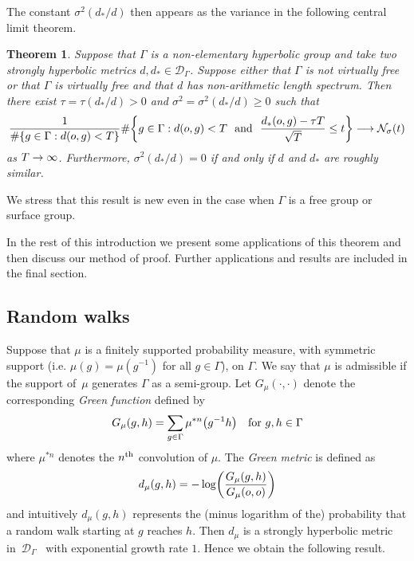 \documentclass[10pt]{amsart}
\theoremstyle{definition}\newtheorem{defi}[theo]{Definition}\newtheorem{rema}[theo]{Remark}\newtheorem{exam}[theo]{Example}\newtheorem{exem}[theo]{Example}\newtheorem{nota}[theo]{Notation}
\newcommand{\G}{\Gamma}
\newcommand{\Dc}{\mathcal{D}}
\newcommand{\Nc}{\mathcal{N}}
\let\originalleft\left
\let\originalright\right
\renewcommand{\left}{\mathopen{}\mathclose\bgroup\originalleft}
\renewcommand{\right}{\aftergroup\egroup\originalright}
\renewcommand*{\to}{\mathchoice{\longrightarrow}{\rightarrow}{\rightarrow}{\rightarrow}}
\newcounter{setofcase}
\newcounter{case}[setofcase]
\theoremstyle{plain}
\newtheorem{theol}{Theorem}
\begin{document}
The constant $\sigma^2(d_\ast/d)$ then appears as the variance in the following central limit theorem.


\begin{theol}\label{thm.main}
Suppose that $\G$ is a non-elementary hyperbolic group and take two strongly hyperbolic metrics $d,d_\ast \in \Dc_\G$. Suppose either that $\G$ is not virtually free or that $\G$ is virtually free and that $d$ has non-arithmetic length spectrum. Then there exist $\tau = \tau(d_\ast/d) >0$ and $\sigma^2 = \sigma^2(d_\ast/d) \ge 0$ such that
\[
\frac{1}{\#\left\{ g \in \G: d(o,g) < T\right\}} \#\left\{ g \in \G: d(o,g) < T \ \text{ and } \ \frac{d_\ast(o,g) - \tau T}{\sqrt{T}} \le t \right\} \to \Nc_\sigma(t)
\]
as $T\to\infty$. Furthermore, $\sigma^2(d_\ast/d) = 0$ if and only if $d$ and $d_\ast$ are roughly similar.
\end{theol}


We stress that this result is new even in the case when $\G$ is a free group or surface group.


In the rest of this introduction we present some applications of this theorem and then discuss our method of proof. Further applications and results are included in the final section.

\subsection{Random walks}

Suppose that $\mu$ is a finitely supported probability measure, with symmetric support (i.e. $\mu(g) = \mu(g^{-1})$ for all $g \in\G$), on $\G$. We say that $\mu$ is admissible if the support of~$\mu$ generates $\G$ as a semi-group. Let $G_\mu(\cdot, \cdot)$ denote the corresponding \emph{Green function} defined by
\[
G_\mu(g,h) = \sum_{g \in\G} \mu^{\ast n} \left(g^{-1}h\right) \quad \text{for }g,h \in \G
\]
where $\mu^{\ast n}$ denotes the $n^{\rm th}$ convolution of $\mu$. The \emph{Green metric} is defined as
\[
d_\mu(g,h) = - \log \left(\frac{G_\mu(g,h)}{G_\mu(o,o)}\right)
\]
and intuitively $d_\mu(g,h)$ represents the (minus logarithm of the) probability that a random walk starting at $g$ reaches $h$. Then $d_\mu$ is a strongly hyperbolic metric in~$\Dc_\G$~\cite{Nica.Spakula} with exponential growth rate $1$. Hence we obtain the following result.
\end{document}
